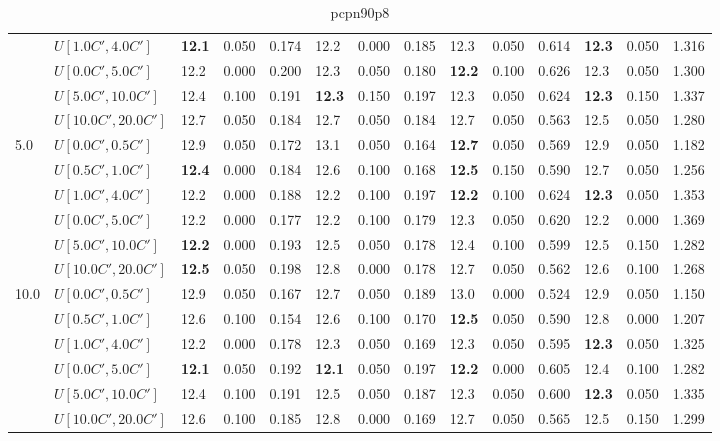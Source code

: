 \begin{table}[h]
{\begin{tabular}{|l|l||l|l|l||l|l|l||l|l|l||l|l|l|}
       & $U[1.0C',4.0C']$ & \textbf{12.1} & 0.050 & 0.174 & 12.2 & 0.000 & 0.185 & 12.3 & 0.050 & 0.614 & \textbf{12.3} & 0.050 & 1.316 \\
       & $U[0.0C',5.0C']$ & 12.2 & 0.000 & 0.200 & 12.3 & 0.050 & 0.180 & \textbf{12.2} & 0.100 & 0.626 & 12.3 & 0.050 & 1.300 \\
       & $U[5.0C',10.0C']$ & 12.4 & 0.100 & 0.191 & \textbf{12.3} & 0.150 & 0.197 & 12.3 & 0.050 & 0.624 & \textbf{12.3} & 0.150 & 1.337 \\
       & $U[10.0C',20.0C']$ & 12.7 & 0.050 & 0.184 & 12.7 & 0.050 & 0.184 & 12.7 & 0.050 & 0.563 & 12.5 & 0.050 & 1.280 \\
      \hline\hline
      \multirow{6}{*}{5.0} & $U[0.0C',0.5C']$ & 12.9 & 0.050 & 0.172 & 13.1 & 0.050 & 0.164 & \textbf{12.7} & 0.050 & 0.569 & 12.9 & 0.050 & 1.182 \\
       & $U[0.5C',1.0C']$ & \textbf{12.4} & 0.000 & 0.184 & 12.6 & 0.100 & 0.168 & \textbf{12.5} & 0.150 & 0.590 & 12.7 & 0.050 & 1.256 \\
       & $U[1.0C',4.0C']$ & 12.2 & 0.000 & 0.188 & 12.2 & 0.100 & 0.197 & \textbf{12.2} & 0.100 & 0.624 & \textbf{12.3} & 0.050 & 1.353 \\
       & $U[0.0C',5.0C']$ & 12.2 & 0.000 & 0.177 & 12.2 & 0.100 & 0.179 & 12.3 & 0.050 & 0.620 & 12.2 & 0.000 & 1.369 \\
       & $U[5.0C',10.0C']$ & \textbf{12.2} & 0.000 & 0.193 & 12.5 & 0.050 & 0.178 & 12.4 & 0.100 & 0.599 & 12.5 & 0.150 & 1.282 \\
       & $U[10.0C',20.0C']$ & \textbf{12.5} & 0.050 & 0.198 & 12.8 & 0.000 & 0.178 & 12.7 & 0.050 & 0.562 & 12.6 & 0.100 & 1.268 \\
      \hline\hline
      \multirow{6}{*}{10.0} & $U[0.0C',0.5C']$ & 12.9 & 0.050 & 0.167 & 12.7 & 0.050 & 0.189 & 13.0 & 0.000 & 0.524 & 12.9 & 0.050 & 1.150 \\
       & $U[0.5C',1.0C']$ & 12.6 & 0.100 & 0.154 & 12.6 & 0.100 & 0.170 & \textbf{12.5} & 0.050 & 0.590 & 12.8 & 0.000 & 1.207 \\
       & $U[1.0C',4.0C']$ & 12.2 & 0.000 & 0.178 & 12.3 & 0.050 & 0.169 & 12.3 & 0.050 & 0.595 & \textbf{12.3} & 0.050 & 1.325 \\
       & $U[0.0C',5.0C']$ & \textbf{12.1} & 0.050 & 0.192 & \textbf{12.1} & 0.050 & 0.197 & \textbf{12.2} & 0.000 & 0.605 & 12.4 & 0.100 & 1.282 \\
       & $U[5.0C',10.0C']$ & 12.4 & 0.100 & 0.191 & 12.5 & 0.050 & 0.187 & 12.3 & 0.050 & 0.600 & \textbf{12.3} & 0.050 & 1.335 \\
       & $U[10.0C',20.0C']$ & 12.6 & 0.100 & 0.185 & 12.8 & 0.000 & 0.169 & 12.7 & 0.050 & 0.565 & 12.5 & 0.150 & 1.299 \\
      \hline
      \end{tabular}
      }
      \caption{pcpn90p8}
      \label{tab:pcpn90p8}\end{table}      
      

